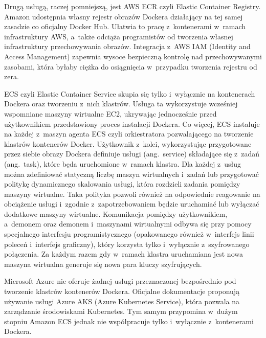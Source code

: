 Drugą usługą, raczej pomniejszą, jest AWS ECR czyli Elastic Container Registry. Amazon udostępnia własny rejestr obrazów Dockera działający na tej samej zasadzie co oficjalny Docker Hub. Ułatwia to pracę z~kontenerami w~ramach infrastruktury AWS, a~także odciąża programistów od tworzenia własnej infrastruktury przechowywania obrazów. Integracja z~AWS IAM (Identity and Access Management) zapewnia wysoce bezpieczną kontrolę nad przechowywanymi zasobami, która byłaby ciężka do osiągnięcia w~przypadku tworzenia rejestru od zera.

ECS czyli Elastic Container Service skupia się tylko i~wyłącznie na kontenerach Dockera oraz tworzeniu z~nich klastrów. Usługa ta wykorzystuje wcześniej wspomniane maszyny wirtualne EC2, ukrywając jednocześnie przed użytkownikiem przedstawiony proces instalacji Dockera. Co więcej, ECS instaluje na każdej z~maszyn agenta ECS czyli orkiestratora pozwalającego na tworzenie klastrów kontenerów Docker. Użytkownik z~kolei, wykorzystując przygotowane przez siebie obrazy Dockera definiuje usługi (ang.~service) składające się z~zadań (ang.~task), które będa uruchomione w~ramach klastra. Dla każdej z~usług można zdefiniować statyczną liczbę maszyn wirtualnych i~zadań lub przygotować politykę dynamicznego skalowania usługi, która rozdzieli zadania pomiędzy maszyny wirtualne. Taka polityka pozwoli również na odpowiednie reagowanie na obciążenie usługi i~zgodnie z~zapotrzebowaniem będzie uruchamiać lub wyłączać dodatkowe maszyny wirtualne. Komunikacja pomiędzy użytkownikiem, a~demonem oraz demonem i~maszynami wirtualnymi odbywa się przy pomocy specjalnego interfesju programistycznego (opakowanego również w~interfejs linii poleceń i~interfejs graficzny), który korzysta tylko i~wyłącznie z~szyfrowanego połączenia. Za każdym razem gdy w~ramach klastra uruchamiana jest nowa maszyna wirtualna generuje się nowa para kluczy szyfrujących.

Microsoft Azure nie oferuje żadnej usługi przeznaczonej bezpośrednio pod tworzenie klastrów kontenerów Dockera. Oficjalne dokumentacje proponują używanie usługi Azure AKS (Azure Kubernetes Service), która pozwala na zarządzanie środowiskami Kubernetes. Tym samym przypomina w~dużym stopniu Amazon ECS jednak nie współpracuje tylko i~wyłącznie z~kontenerami Dockera. 

